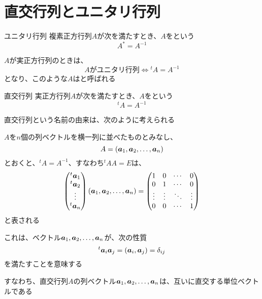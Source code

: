 \documentclass[../../../topic_linear-algebra]{subfiles}
\begin{document}
\sectionline
\section{直交行列とユニタリ行列}

\begin{definition}{ユニタリ行列}
  複素正方行列$A$が次を満たすとき、$A$をという
  \begin{equation*}
    A^* = A^{-1}
  \end{equation*}
\end{definition}

$A$が実正方行列のときは、
\begin{equation*}
  A\text{がユニタリ行列} \Longleftrightarrow {}^tA = A^{-1}
\end{equation*}
となり、このような$A$はと呼ばれる

\begin{definition}{直交行列}
  実正方行列$A$が次を満たすとき、$A$をという
  \begin{equation*}
    {}^t A = A^{-1}
  \end{equation*}
\end{definition}

直交行列という名前の由来は、次のように考えられる

\br

$A$を$n$個の列ベクトルを横一列に並べたものとみなし、
\begin{equation*}
  A = (\vb*{a}_1, \vb*{a}_2, \ldots, \vb*{a}_n)
\end{equation*}
とおくと、${}^t A = A^{-1}$、すなわち${}^tAA = E$は、
\begin{equation*}
  \begin{pmatrix}
    {}^t \vb*{a}_1 \\
    {}^t \vb*{a}_2 \\
    \vdots         \\
    {}^t \vb*{a}_n
  \end{pmatrix} \left(
  \vb*{a}_1, \vb*{a}_2, \ldots, \vb*{a}_n
  \right) = \begin{pmatrix}
    1      & 0      & \cdots & 0      \\
    0      & 1      & \cdots & 0      \\
    \vdots & \vdots & \ddots & \vdots \\
    0      & 0      & \cdots & 1
  \end{pmatrix}
\end{equation*}
と表される

\br

これは、ベクトル$\vb*{a}_1, \vb*{a}_2, \ldots, \vb*{a}_n$が、次の性質
\begin{equation*}
  {}^t \vb*{a}_i \vb*{a}_j =(\vb*{a}_i, \vb*{a}_j) = \delta_{ij}
\end{equation*}
を満たすことを意味する

\br

すなわち、直交行列$A$の列ベクトル$\vb*{a}_1, \vb*{a}_2, \ldots, \vb*{a}_n$は、互いに直交する単位ベクトルである
\end{document}
